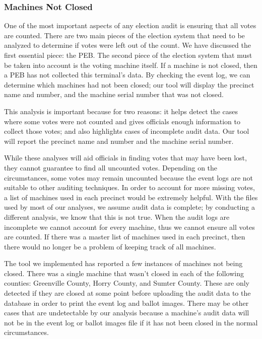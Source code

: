 \subsubsection{Machines Not Closed}
One of the most important aspects of any election audit is ensuring that all votes are counted.  There are two main pieces of the election system that need to be analyzed to determine if votes were left out of the count.  We have discussed the first essential piece: the PEB.  The second piece of the election system that must be taken into account is the voting machine itself.  If a machine is not closed, then a PEB has not collected this terminal's data.  By checking the event log, we can determine which machines had not been closed; our tool will display the precinct name and number, and the machine serial number that was not closed.  

This analysis is important because for two reasons: it helps detect the cases where some votes were not counted and gives officials enough information to collect those votes; and also highlights cases of incomplete audit data.  Our tool will report the precinct name and number and the machine serial number. 

While these analyses will aid officials in finding votes that may have been lost, they cannot guarantee to find all uncounted votes.  Depending on the circumstances, some votes may remain uncounted because the event logs are not suitable to other auditing techniques.  In order to account for more missing votes, a list of machines used in each precinct would be extremely helpful.  With the files used by most of our analyses, we assume audit data is complete; by conducting a different analysis, we know that this is not true.  When the audit logs are incomplete we cannot account for every machine, thus we cannot ensure all votes are counted.  If there was a master list of machines used in each precinct, then there would no longer be a problem of keeping track of all machines.  

The tool we implemented has reported a few instances of machines not being closed.  There was a single machine that wasn't closed in each of the following counties: Greenville County, Horry County, and Sumter County.  These are only detected if they are closed at some point before uploading the audit data to the database in order to print the event log and ballot images.  There may be other cases that are undetectable by our analysis because a machine's audit data will not be in the event log or ballot images file if it has not been closed in the normal circumstances. 
